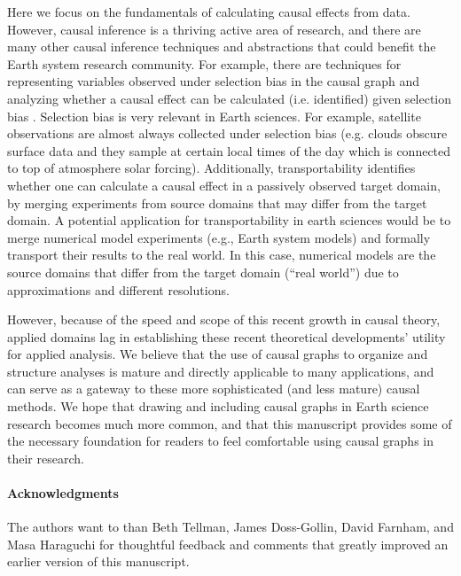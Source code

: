 \documentclass[12pt]{article}
\begin{document}
Here we focus on the fundamentals of calculating causal effects from
data. However, causal inference is a thriving active area of research,
and there are many other causal inference techniques and abstractions
that could benefit the Earth system research community. For example,
there are techniques for representing variables observed under
selection bias in the causal graph and analyzing whether a causal
effect can be calculated (i.e. identified) given selection bias
\citep[e.g.,][]{bareinboim2014recovering,correa2018generalized}. Selection
bias is very relevant in Earth sciences. For example, satellite
observations are almost always collected under selection bias
(e.g. clouds obscure surface data and they sample at certain local
times of the day which is connected to top of atmosphere solar
forcing). Additionally, transportability
\citep[e.g.,][]{bareinboim2012transportability,Bareinboim7345,lee2019general}
identifies whether one can calculate a causal effect in a passively
observed target domain, by merging experiments from source domains
that may differ from the target domain. A potential application for
transportability in earth sciences would be to merge numerical model
experiments (e.g., Earth system models) and formally transport their
results to the real world. In this case, numerical models are the
source domains that differ from the target domain (``real world'') due
to approximations and different resolutions.

However, because of the speed and scope of this recent growth in
causal theory, applied domains lag in establishing these recent
theoretical developments' utility for applied analysis. We believe
that the use of causal graphs to organize and structure analyses is
mature and directly applicable to many applications, and can serve as
a gateway to these more sophisticated (and less mature) causal
methods. We hope that drawing and including causal graphs in Earth
science research becomes much more common, and that this manuscript
provides some of the necessary foundation for readers to feel
comfortable using causal graphs in their research.

\paragraph{Acknowledgments} The authors want to than Beth Tellman,
James Doss-Gollin, David Farnham, and Masa Haraguchi for thoughtful
feedback and comments that greatly improved an earlier version of this
manuscript.



\end{document}
